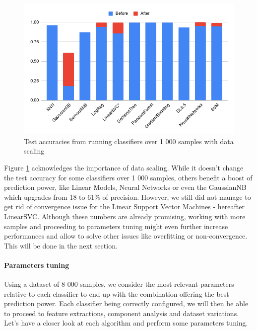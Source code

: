 \begin{figure}[!ht]
  \includegraphics[width=\linewidth]{Figures/data_scaling.png}
  \captionsetup{justification=centering}
  \caption{Test accuracies from running classifiers over 1 000 samples with data scaling}
  \label{fig:data_scaling}
\end{figure}
Figure \ref{fig:data_scaling} acknowledges the importance of data scaling. While it doesn't change the test accuracy for some classifiers over 1 000 samples, others benefit a boost of prediction power, like Linear Models, Neural Networks or even the GaussianNB which upgrades from 18 to 61\% of precision. However, we still did not manage to get rid of convergence issue for the Linear Support Vector Machines - hereafter LinearSVC. 
Although these numbers are already promising, working with more samples and proceeding to parameters tuning might even further increase performances and allow to solve other issues like overfitting or non-convergence. This will be done in the next section.

\paragraph{Parameters tuning}

Using a dataset of 8 000 samples, we consider the most relevant parameters relative to each classifier to end up with the combination offering the best prediction power. Each classifier being correctly configured, we will then be able to proceed to feature extractions, component analysis and dataset variations. Let's have a closer look at each algorithm and perform some parameters tuning.

